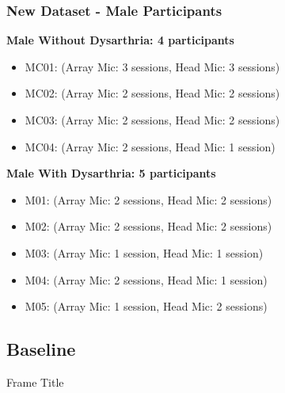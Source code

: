 \begin{frame}
    \frametitle{New Dataset - Male Participants}
    \textbf{Male Without Dysarthria: 4 participants}
    \begin{itemize}
        \item MC01: (Array Mic: 3 sessions, Head Mic: 3 sessions)
        \item MC02: (Array Mic: 2 sessions, Head Mic: 2 sessions)
        \item MC03: (Array Mic: 2 sessions, Head Mic: 2 sessions)
        \item MC04: (Array Mic: 2 sessions, Head Mic: 1 session)
    \end{itemize}
    
    \textbf{Male With Dysarthria: 5 participants}
    \begin{itemize}
        \item M01: (Array Mic: 2 sessions, Head Mic: 2 sessions)
        \item M02: (Array Mic: 2 sessions, Head Mic: 2 sessions)
        \item M03: (Array Mic: 1 session, Head Mic: 1 session)
        \item M04: (Array Mic: 2 sessions, Head Mic: 1 session)
        \item M05: (Array Mic: 1 session, Head Mic: 2 sessions)
    \end{itemize}
\end{frame}

\subsection{Baseline}
\begin{frame}{Frame Title}
    
\end{frame}